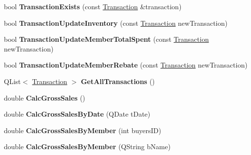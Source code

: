\begin{DoxyCompactItemize}
\item 
\mbox{\label{class_d_b_manager_a0fb486dbd34ea77233e9d3135dfaf491}} 
bool {\bfseries Transaction\+Exists} (const \mbox{\hyperlink{class_transaction}{Transaction}} \&transaction)
\item 
\mbox{\label{class_d_b_manager_afa249651a4fc308b2860178affcdc038}} 
bool {\bfseries Transaction\+Update\+Inventory} (const \mbox{\hyperlink{class_transaction}{Transaction}} new\+Transaction)
\item 
\mbox{\label{class_d_b_manager_ae7d52a640d51fac0ee84dfef854cc3bb}} 
bool {\bfseries Transaction\+Update\+Member\+Total\+Spent} (const \mbox{\hyperlink{class_transaction}{Transaction}} new\+Transaction)
\item 
\mbox{\label{class_d_b_manager_aa5ef47dccee63a1fafebc78cccd57bb1}} 
bool {\bfseries Transaction\+Update\+Member\+Rebate} (const \mbox{\hyperlink{class_transaction}{Transaction}} new\+Transaction)
\item 
\mbox{\label{class_d_b_manager_ad5e011a926e8b4d35097a7b06d08d353}} 
Q\+List$<$ \mbox{\hyperlink{class_transaction}{Transaction}} $>$ {\bfseries Get\+All\+Transactions} ()
\item 
\mbox{\label{class_d_b_manager_a5548272ea745a70e74fa2ad8bd813f0e}} 
double {\bfseries Calc\+Gross\+Sales} ()
\item 
\mbox{\label{class_d_b_manager_a336e9ed6e7bd33f10c369321d3246b7a}} 
double {\bfseries Calc\+Gross\+Sales\+By\+Date} (Q\+Date t\+Date)
\item 
\mbox{\label{class_d_b_manager_abfc8f678c6dfc4225772a1ed73db2e48}} 
double {\bfseries Calc\+Gross\+Sales\+By\+Member} (int buyers\+ID)
\item 
\mbox{\label{class_d_b_manager_a506ef708818457200abe6e883cbf84ab}} 
double {\bfseries Calc\+Gross\+Sales\+By\+Member} (Q\+String b\+Name)
\item 
\mbox{\label{class_d_b_manager_ae5e21fcdd119fdc62d7d76018cbdc1e7}} 

\end{DoxyCompactItemize}
